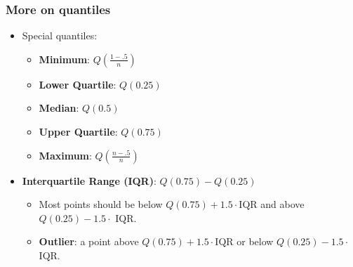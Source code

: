\documentclass[handout]{beamer}\usepackage{graphicx, color}
\numberwithin{equation}{section}
\begin{document}
\begin{frame}
\frametitle{More on quantiles}

\begin{itemize}
\item Special quantiles:
\begin{itemize}
\item {\bf Minimum}: $Q\left ( \frac{1 - .5}{n}\right)$
\pause \item {\bf Lower Quartile}: $Q(0.25)$
\pause \item {\bf Median}: $Q(0.5)$
\pause \item {\bf Upper Quartile}: $Q(0.75)$
\pause \item {\bf Maximum}: $Q\left ( \frac{n - .5}{n} \right ) $
\end{itemize}
\pause \item {\bf Interquartile Range (IQR)}: $Q(0.75) - Q(0.25)$
\begin{itemize}
\pause \item Most points should be below $Q(0.75) + 1.5 \cdot $IQR and above $Q(0.25) - 1.5 \cdot$ IQR. 
\item {\bf Outlier}: a point above $Q(0.75) + 1.5 \cdot $IQR or below $Q(0.25) - 1.5 \cdot$ IQR. 
\end{itemize}
\end{itemize}
\end{frame}

\end{document}

